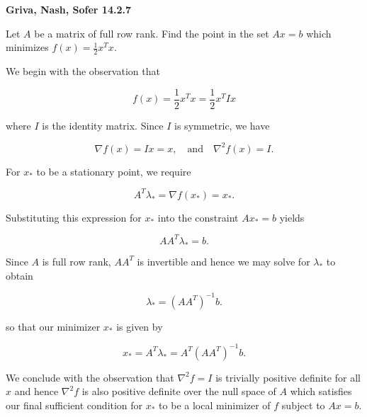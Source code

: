 \textbf{Griva, Nash, Sofer 14.2.7}

Let $A$ be a matrix of full row rank. Find the point in the set $Ax = b$ which minimizes $f(x) = \frac{1}{2} x^T x$.

\begin{solution}
    We begin with the observation that

    $$
    f(x) = \frac{1}{2} x^T x = \frac{1}{2} x^T I x
    $$

    where $I$ is the identity matrix. Since $I$ is symmetric, we have

    $$
    \nabla f(x) = I x = x, \quad \text{and} \quad \nabla^2 f(x) = I.
    $$

    For $x_*$ to be a stationary point, we require

    $$
    A^T \lambda_* = \nabla f(x_*) = x_*.
    $$

    Substituting this expression for $x_*$ into the constraint $A x_* = b$ yields

    $$
    A A^T \lambda_* = b.
    $$

    Since $A$ is full row rank, $A A^T$ is invertible and hence we may solve for $\lambda_*$ to obtain

    $$
    \lambda_* = \left(A A^T \right)^{-1} b.
    $$

    so that our minimizer $x_*$ is given by

    $$
    x_* = A^T \lambda_* = A^T \left(A A^T \right)^{-1} b.
    $$

    We conclude with the observation that $\nabla^2 f = I$ is trivially positive definite for all $x$ and hence 
    $\nabla^2 f$ is also positive definite over the null space of $A$ which satisfies our final sufficient condition for
    $x_*$ to be a local minimizer of $f$ subject to $Ax = b$.
    \ \\
\end{solution}